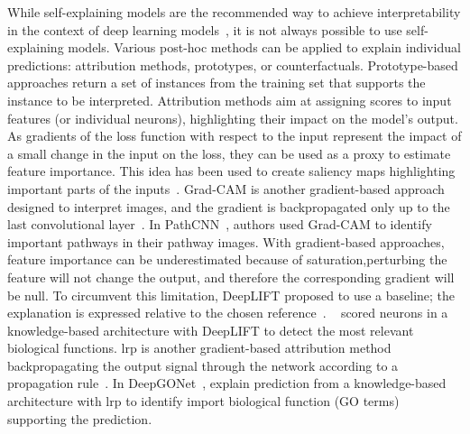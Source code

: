 \documentclass[../main.tex]{subfiles}
\begin{document}
	While self-explaining models are the recommended way to achieve interpretability in the context of deep learning models~\cite{Rudin2019}, it is not always possible to use self-explaining models.
	Various post-hoc methods can be applied to explain individual predictions: attribution methods, prototypes, or counterfactuals.
	Prototype-based approaches return a set of instances from the training set that supports the instance to be interpreted.
	Attribution methods aim at assigning scores to input features (or individual neurons), highlighting their impact on the model's output.
	As gradients of the loss function with respect to the input represent the impact of a small change in the input on the loss, they can be used as a proxy to estimate feature importance.
	This idea has been used to create saliency maps highlighting important parts of the inputs~\cite{intGrad}.
	Grad-CAM is another gradient-based approach designed to interpret images, and the gradient is backpropagated only up to the last convolutional layer~\cite{GradCAM}.
	In PathCNN~\cite{PathCNN}, authors used Grad-CAM to identify important pathways in their pathway images.
	With gradient-based approaches, feature importance can be underestimated because of saturation,\ie{}perturbing the feature will not change the output, and therefore the corresponding gradient will be null.
	To circumvent this limitation, DeepLIFT proposed to use a baseline; the explanation is expressed relative to the chosen reference~\cite{DeepLIFT}.
	\citeauthor{PNet}~\cite{PNet} scored neurons in a knowledge-based architecture with DeepLIFT to detect the most relevant biological functions.
	\Gls{lrp} is another gradient-based attribution method backpropagating the output signal through the network according to a propagation rule~\cite{LRP}.
	In DeepGONet~\cite{bourgeaisDeepGONetSelfexplainable2021}, \citeauthor{bourgeaisDeepGONetSelfexplainable2021} explain prediction from a knowledge-based architecture with \gls{lrp} to identify import biological function (GO terms)
	supporting the prediction.
\end{document}
